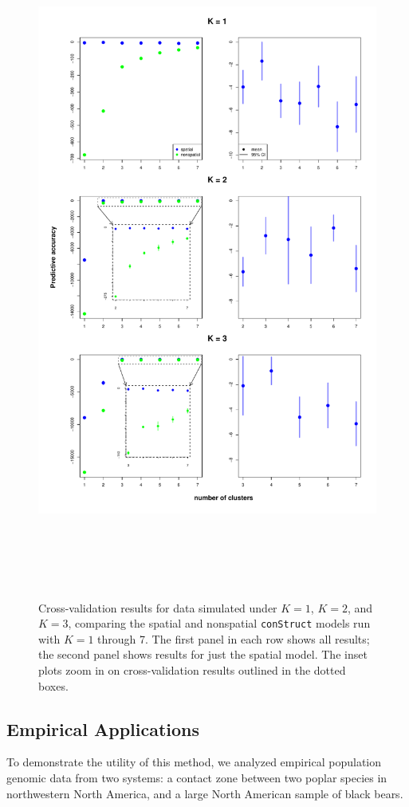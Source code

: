 \documentclass[12pt]{article}
\begin{document}
\begin{figure}
	\centering
		{\includegraphics[width=6in,height=8.5in]{figs/sims/xvals.pdf}}
	\caption{
	Cross-validation results for data simulated under $K=1$, $K=2$, and $K=3$, 
	comparing the spatial and nonspatial \texttt{conStruct} models run with $K=1$ through 7.  
	The first panel in each row shows all results; 
	the second panel shows results for just the spatial model.
	The inset plots zoom in on cross-validation results outlined in the dotted boxes.
    }\label{sim_xvals}
\end{figure}

\subsection*{Empirical Applications}
To demonstrate the utility of this method, we analyzed empirical population genomic data from two systems:
a contact zone between two poplar species in northwestern North America,
and a large North American sample of black bears.
\end{document}
